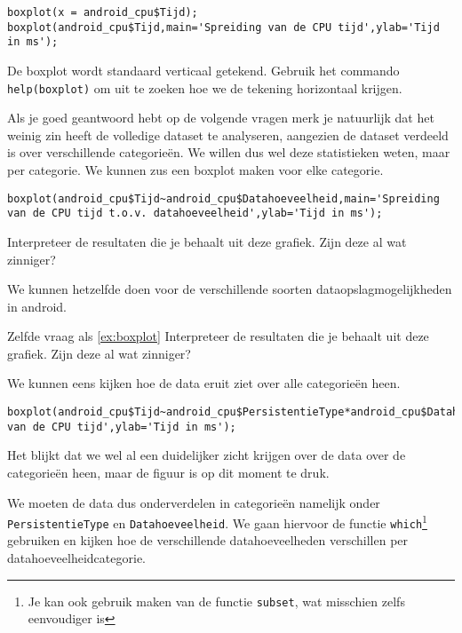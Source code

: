\begin{lstlisting}
boxplot(x = android_cpu$Tijd);
boxplot(android_cpu$Tijd,main='Spreiding van de CPU tijd',ylab='Tijd in ms');
\end{lstlisting} 

\begin{exercise}
	De boxplot wordt standaard verticaal getekend. Gebruik het commando \texttt{help(boxplot)} om uit te zoeken hoe we de tekening horizontaal krijgen. 
\end{exercise}

Als je goed geantwoord hebt op de volgende vragen merk je natuurlijk dat het weinig zin heeft de volledige dataset te analyseren, aangezien de dataset verdeeld is over verschillende categorie\"en. We willen dus wel deze statistieken weten, maar per categorie. We kunnen zus een boxplot maken voor elke categorie.

\begin{lstlisting}
boxplot(android_cpu$Tijd~android_cpu$Datahoeveelheid,main='Spreiding van de CPU tijd t.o.v. datahoeveelheid',ylab='Tijd in ms');
\end{lstlisting}

\begin{exercise}
	\label{ex:boxplot}
	Interpreteer de resultaten die je behaalt uit deze grafiek. Zijn deze al wat zinniger?
\end{exercise}

We kunnen hetzelfde doen voor de verschillende soorten dataopslagmogelijkheden in android.

\begin{exercise}
	Zelfde vraag als \ref{ex:boxplot} Interpreteer de resultaten die je behaalt uit deze grafiek. Zijn deze al wat zinniger?
\end{exercise}

We kunnen eens kijken hoe de data eruit ziet over alle categorie\"en heen.

\begin{lstlisting}
boxplot(android_cpu$Tijd~android_cpu$PersistentieType*android_cpu$Datahoeveelheid,main='Spreiding van de CPU tijd',ylab='Tijd in ms');
\end{lstlisting}

Het blijkt dat we wel al een duidelijker zicht krijgen over de data over de categorie\"en heen, maar de figuur is op dit moment te druk. 

We moeten de data dus onderverdelen in categorie\"en namelijk onder \texttt{PersistentieType} en \texttt{Datahoeveelheid}. We gaan hiervoor de functie \texttt{which}\footnote{Je kan ook gebruik maken van de functie \texttt{subset}, wat misschien zelfs eenvoudiger is} gebruiken en kijken hoe de verschillende datahoeveelheden verschillen per datahoeveelheidcategorie. 

